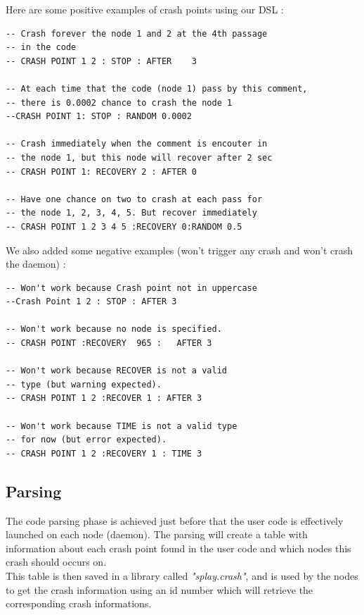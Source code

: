 \documentclass{eplmastersthesis}
\begin{document}
          Here are some positive examples of crash points using our DSL :

          \begin{lstlisting}[style=MyLua]
-- Crash forever the node 1 and 2 at the 4th passage
-- in the code
-- CRASH POINT 1 2 : STOP : AFTER    3

-- At each time that the code (node 1) pass by this comment,
-- there is 0.0002 chance to crash the node 1
--CRASH POINT 1: STOP : RANDOM 0.0002

-- Crash immediately when the comment is encouter in
-- the node 1, but this node will recover after 2 sec
-- CRASH POINT 1: RECOVERY 2 : AFTER 0

-- Have one chance on two to crash at each pass for
-- the node 1, 2, 3, 4, 5. But recover immediately
-- CRASH POINT 1 2 3 4 5 :RECOVERY 0:RANDOM 0.5
            \end{lstlisting}

          We also added some negative examples (won't trigger any crash
          and won't crash the daemon) :

          \begin{lstlisting}[style=MyLua]
-- Won't work because Crash point not in uppercase
--Crash Point 1 2 : STOP : AFTER 3

-- Won't work because no node is specified.
-- CRASH POINT :RECOVERY  965 :   AFTER 3

-- Won't work because RECOVER is not a valid
-- type (but warning expected).
-- CRASH POINT 1 2 :RECOVER 1 : AFTER 3

-- Won't work because TIME is not a valid type
-- for now (but error expected).
-- CRASH POINT 1 2 :RECOVERY 1 : TIME 3
          \end{lstlisting}

        \subsection{Parsing}

          The code parsing phase is achieved just before that the user code
          is effectively launched on each node (daemon). The parsing will
          create a table with information about each crash point found in the
          user code and which nodes this crash should occurs on.\\
          This table is then saved in a library called \textit{"splay.crash"},
          and is used by the nodes to get the crash information using an id
          number which will retrieve the corresponding crash informations.\\
\end{document}
